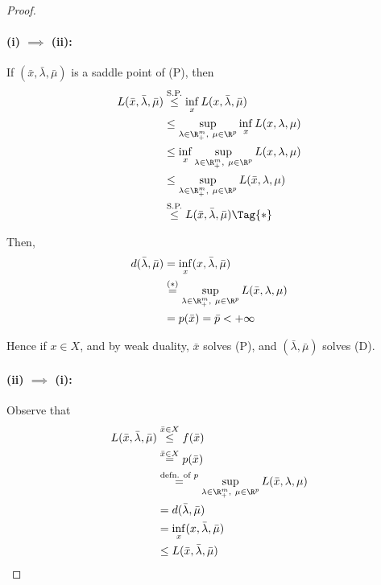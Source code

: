 \begin{proof}
	\paragraph{(i) $\implies$ (ii):}

	If $(\bar x,\bar\lambda,\bar\mu)$ is a saddle point of (P), then
	\begin{align*}
		L(\bar x,\bar\lambda,\bar\mu)
		 & \stackrel{\text{S.P.}}{\leq}\inf_{x}L(x,\bar\lambda,\bar\mu)      \\
		 & \leq\sup_{\lambda\in\R^m_+,\ \mu\in\R^p}\inf_{x}L(x,\lambda,\mu)  \\
		 & \leq\inf_{x}\sup_{\lambda\in\R^m_+,\ \mu\in\R^p}L(x,\lambda,\mu)  \\
		 & \leq\sup_{\lambda\in\R^m_+,\ \mu\in\R^p}L(\bar x,\lambda,\mu)     \\
		 & \stackrel{\text{S.P.}}{\leq} L(\bar x,\bar\lambda,\bar\mu)\Tag{*}
	\end{align*}


	Then,
	\begin{align*}
		d(\bar\lambda,\bar\mu)
		 & =\inf_{x} (x,\bar\lambda,\bar\mu)                                        \\
		 & \stackrel{(*)}=\sup_{\lambda\in\R^m_+,\ \mu\in\R^p}L(\bar x,\lambda,\mu) \\
		 & = p(\bar x) = \bar p<+\infty
	\end{align*}

	Hence if $x\in X$, and by weak duality, $\bar x$ solves (P), and
	$(\bar\lambda,\bar\mu)$ solves (D).

	\paragraph{(ii) $\implies$ (i):}

	Observe that
	\begin{align*}
		L(\bar x,\bar\lambda,\bar\mu)
		 & \stackrel{\bar x\in X}{\leq} f(\bar x)                                                 \\
		 & \stackrel{\bar x\in X}= p(\bar x)                                                      \\
		 & \stackrel{\text{defn. of }p}=\sup_{\lambda\in\R^m_+,\ \mu\in\R^p}L(\bar x,\lambda,\mu) \\
		 & =d(\bar\lambda,\bar\mu)                                                                \\
		 & =\inf_{x} (x,\bar\lambda,\bar\mu)                                                      \\
		 & \leq L(\bar x,\bar\lambda,\bar\mu)                                                     \\
	\end{align*}


\end{proof}
